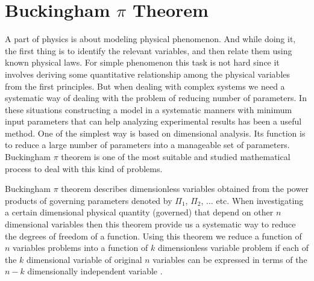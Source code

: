 \section{Buckingham $\pi$ Theorem}
A part of physics is about modeling physical phenomenon. And while doing it, the first thing is to identify the relevant variables, and then relate them using known physical laws. For simple phenomenon this task is not hard since it involves deriving some quantitative relationship among the physical variables from the first principles. But when dealing with complex systems we need a systematic way of dealing with the problem of reducing number of parameters. In these situations constructing a model in a systematic manners with minimum input parameters that can help analyzing experimental results has been a useful method. One of the simplest way is based on dimensional analysis. Its function is to reduce a large number of parameters into a manageable set of parameters. Buckingham $\pi$ theorem is one of the most suitable and studied mathematical process to deal with this kind of problems.


Buckingham $\pi$ theorem describes dimensionless variables obtained from the power products of governing parameters denoted by $\Pi_1$, $\Pi_2$, $\ldots$ etc. When investigating a certain dimensional physical quantity (governed) that depend on other $n$ dimensional variables then this theorem provide us a systematic way to reduce the degrees of freedom of a function. Using this theorem we reduce a function of $n$ variables problems into a function of $k$ dimensionless variable problem if each of the $k$ dimensional variable of original $n$ variables can be expressed in terms of the $n-k$ dimensionally independent variable \cite{Buckingham1914}.


